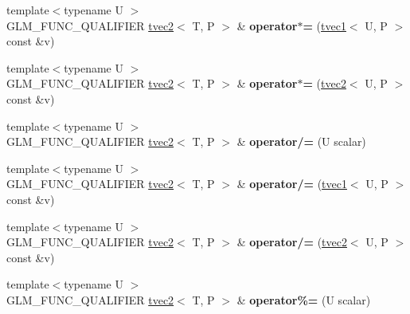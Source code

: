 \begin{DoxyCompactItemize}
{\footnotesize template$<$typename U $>$ }\\G\+L\+M\+\_\+\+F\+U\+N\+C\+\_\+\+Q\+U\+A\+L\+I\+F\+I\+ER \hyperlink{structglm_1_1tvec2}{tvec2}$<$ T, P $>$ \& {\bfseries operator$\ast$=} (\hyperlink{structglm_1_1tvec1}{tvec1}$<$ U, P $>$ const \&v)
\item 
\mbox{\label{structglm_1_1tvec2_a993842ad4e15e45284bd39b7ceaa7dd3}} 
{\footnotesize template$<$typename U $>$ }\\G\+L\+M\+\_\+\+F\+U\+N\+C\+\_\+\+Q\+U\+A\+L\+I\+F\+I\+ER \hyperlink{structglm_1_1tvec2}{tvec2}$<$ T, P $>$ \& {\bfseries operator$\ast$=} (\hyperlink{structglm_1_1tvec2}{tvec2}$<$ U, P $>$ const \&v)
\item 
\mbox{\label{structglm_1_1tvec2_a50542837f7d732334ecf178403a4100b}} 
{\footnotesize template$<$typename U $>$ }\\G\+L\+M\+\_\+\+F\+U\+N\+C\+\_\+\+Q\+U\+A\+L\+I\+F\+I\+ER \hyperlink{structglm_1_1tvec2}{tvec2}$<$ T, P $>$ \& {\bfseries operator/=} (U scalar)
\item 
\mbox{\label{structglm_1_1tvec2_a19b74b0db17121ccf51b68fc25e579a2}} 
{\footnotesize template$<$typename U $>$ }\\G\+L\+M\+\_\+\+F\+U\+N\+C\+\_\+\+Q\+U\+A\+L\+I\+F\+I\+ER \hyperlink{structglm_1_1tvec2}{tvec2}$<$ T, P $>$ \& {\bfseries operator/=} (\hyperlink{structglm_1_1tvec1}{tvec1}$<$ U, P $>$ const \&v)
\item 
\mbox{\label{structglm_1_1tvec2_a572fa5d63392fd44f7bbdd35cbed43ca}} 
{\footnotesize template$<$typename U $>$ }\\G\+L\+M\+\_\+\+F\+U\+N\+C\+\_\+\+Q\+U\+A\+L\+I\+F\+I\+ER \hyperlink{structglm_1_1tvec2}{tvec2}$<$ T, P $>$ \& {\bfseries operator/=} (\hyperlink{structglm_1_1tvec2}{tvec2}$<$ U, P $>$ const \&v)
\item 
\mbox{\label{structglm_1_1tvec2_ab4ffac9c9fc45f4156d271accb5920a7}} 
{\footnotesize template$<$typename U $>$ }\\G\+L\+M\+\_\+\+F\+U\+N\+C\+\_\+\+Q\+U\+A\+L\+I\+F\+I\+ER \hyperlink{structglm_1_1tvec2}{tvec2}$<$ T, P $>$ \& {\bfseries operator\%=} (U scalar)
\item 
\mbox{\label{structglm_1_1tvec2_aea6f1233a9ef7b8c12cee037fa5f7b9d}} 

\end{DoxyCompactItemize}

